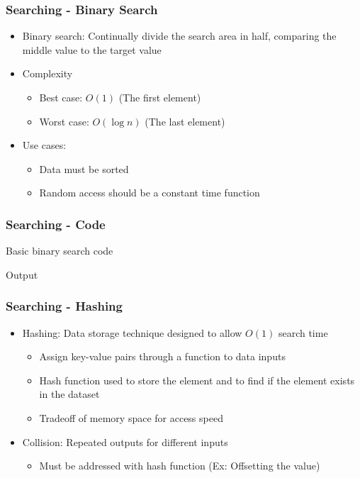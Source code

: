 \documentclass[c, aspectratio=169]{beamer}
\begin{document}
\begin{frame}\frametitle{Searching - Binary Search}
\begin{itemize}
\item Binary search: Continually divide the search area in half, comparing the middle value to the target value
\item Complexity
	\begin{itemize}
	\item Best case: $O(1)$ (The first element)
	\item Worst case: $O(\log n)$ (The last element)
	\end{itemize}
\item Use cases:
	\begin{itemize}
	\item Data must be sorted
	\item Random access should be a constant time function
	\end{itemize}
\end{itemize}
\end{frame}

\begin{frame}\frametitle{Searching - Code}
Basic binary search code


Output

\end{frame}

\begin{frame}\frametitle{Searching - Hashing}
\begin{itemize}
\item Hashing: Data storage technique designed to allow $O(1)$ search time
	\begin{itemize}
	\item Assign key-value pairs through a function to data inputs
	\item Hash function used to store the element and to find if the element exists in the dataset
	\item Tradeoff of memory space for access speed
	\end{itemize}
\item Collision: Repeated outputs for different inputs
	\begin{itemize}
	\item Must be addressed with hash function (Ex: Offsetting the value)
	\end{itemize}
\end{itemize}
\end{frame}
\end{document}
